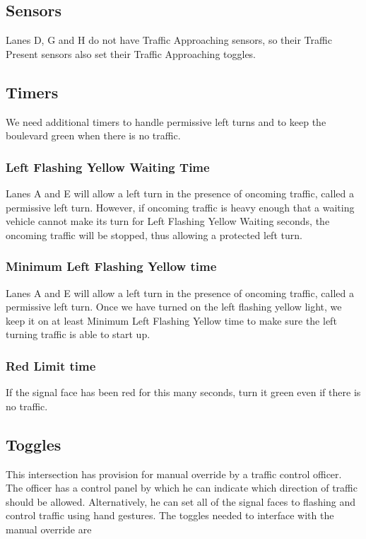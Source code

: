 \documentclass[letterpaper,twoside]{article}
\begin{document}
\subsection{Sensors}

Lanes D, G and H do not have Traffic Approaching sensors, so their
Traffic Present sensors also set their Traffic Approaching toggles.

\subsection{Timers}

We need additional timers to handle permissive left turns and to
keep the boulevard green when there is no traffic.

\subsubsection{Left Flashing Yellow Waiting Time}

Lanes A and E will allow a left turn in the presence of oncoming traffic,
called a permissive left turn. However, if oncoming traffic is heavy enough
that a waiting vehicle cannot make its turn for Left Flashing Yellow Waiting
seconds, the oncoming traffic will be stopped, thus allowing a protected left
turn.

\subsubsection{Minimum Left Flashing Yellow time}

Lanes A and E will allow a left turn in the presence of oncoming traffic,
called a permissive left turn. Once we have turned on the left flashing
yellow light, we keep it on at least Minimum Left Flashing Yellow time
to make sure the left turning traffic is able to start up.

\subsubsection{Red Limit time}
If the signal face has been red for this many seconds, turn it green
even if there is no traffic.

\subsection{Toggles}

This intersection has provision for manual override by a traffic control
officer.  The officer has a control panel by which he can indicate which
direction of traffic should be allowed.  Alternatively, he can set all
of the signal faces to flashing and control traffic using hand gestures.
The toggles needed to interface with the manual override are
\end{document}
